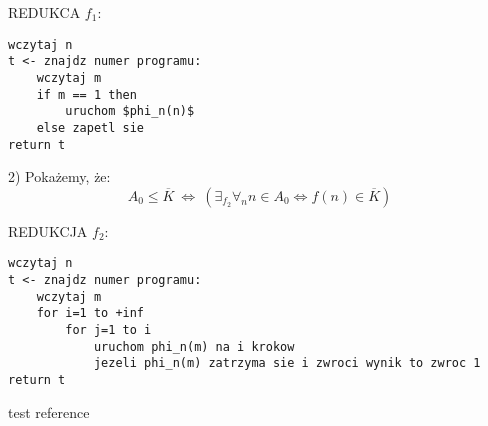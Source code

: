 \documentclass[svgnames]{report}
\begin{document}
REDUKCA $f_1$:
\begin{lstlisting}
wczytaj n
t <- znajdz numer programu:
	wczytaj m
	if m == 1 then
		uruchom $phi_n(n)$
	else zapetl sie
return t
\end{lstlisting}

2) Pokażemy, że:
\begin{equation*}
A_0 \leqslant \overline{K} \ \Leftrightarrow \ (\exists_{f_2} \forall_n n \in A_0 \Leftrightarrow f(n) \in \overline{K} )
\end{equation*}

REDUKCJA $f_2$:
\begin{lstlisting}
wczytaj n
t <- znajdz numer programu:
	wczytaj m
	for i=1 to +inf
		for j=1 to i
			uruchom phi_n(m) na i krokow 
			jezeli phi_n(m) zatrzyma sie i zwroci wynik to zwroc 1
return t	
\end{lstlisting}

\begin{thebibliography}{99}
 test reference
\end{thebibliography}
\end{document}
